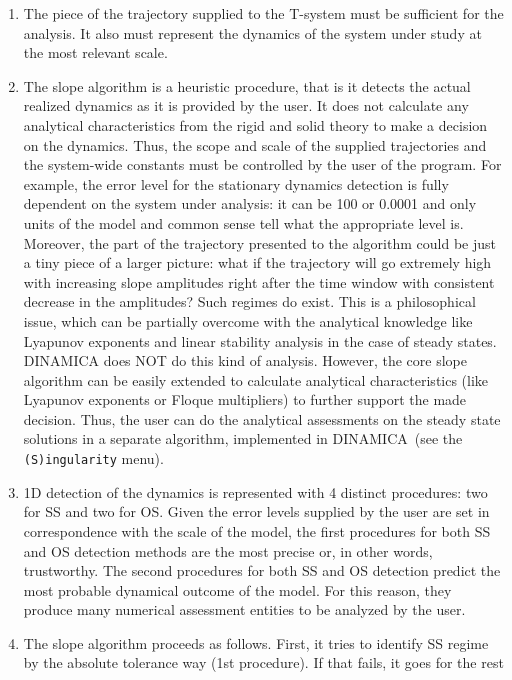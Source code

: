 \documentclass[11pt,a4paper]{article}
\begin{document}
\begin{enumerate}
\item The piece of the trajectory supplied to the T-system must be sufficient for the
  analysis. It also must represent the dynamics of the system under study at the most
  relevant scale.
\item The slope algorithm is a heuristic procedure, that is it detects the actual
  realized dynamics as it is provided by the user. It does not calculate any
  analytical characteristics from the rigid and solid theory to make a decision on
  the dynamics. Thus, the scope and scale of the supplied trajectories and the
  system-wide constants must be controlled by the user of the program. For example,
  the error level for the stationary dynamics detection is fully dependent on the
  system under analysis: it can be 100 or 0.0001 and only units of the model and
  common sense tell what the appropriate level is. Moreover, the part of the
  trajectory presented to the algorithm could be just a tiny piece of a larger
  picture: what if the trajectory will go extremely high with increasing slope
  amplitudes right after the time window with consistent decrease in the amplitudes?
  Such regimes do exist. This is a philosophical issue, which can be partially
  overcome with the analytical knowledge like Lyapunov exponents and linear stability
  analysis in the case of steady states. DINAMICA does NOT do this kind of
  analysis. However, the core slope algorithm can be easily extended to calculate
  analytical characteristics (like Lyapunov exponents or Floque multipliers) to
  further support the made decision. Thus, the user can do the analytical assessments
  on the steady state solutions in a separate algorithm, implemented in DINAMICA~(see
  the \texttt{(S)ingularity} menu).
\item 1D detection of the dynamics is represented with 4 distinct procedures: two for
  SS and two for OS. Given the error levels supplied by the user are set in
  correspondence with the scale of the model, the first procedures for both SS and OS
  detection methods are the most precise or, in other words, trustworthy. The second
  procedures for both SS and OS detection predict the most probable dynamical outcome
  of the model. For this reason, they produce many numerical assessment entities to
  be analyzed by the user.
\item The slope algorithm proceeds as follows. First, it tries to identify SS regime
  by the absolute tolerance way (1st procedure). If that fails, it goes for the rest

\end{enumerate}
\end{document}
